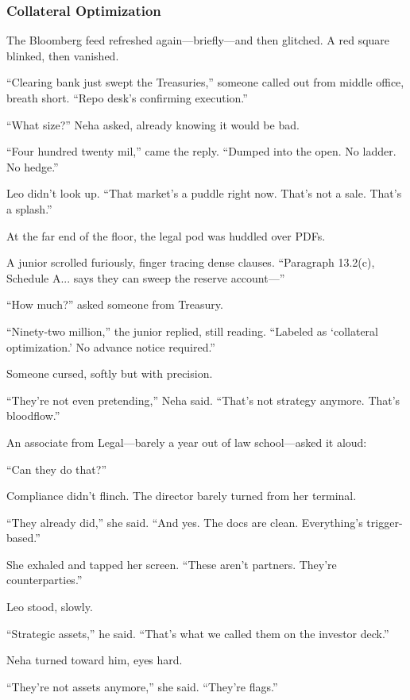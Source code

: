 \medskip

\subsubsection{Collateral Optimization}

The Bloomberg feed refreshed again—briefly—and then glitched.
A red square blinked, then vanished.

“Clearing bank just swept the Treasuries,” someone called out from middle office, breath short. “Repo desk’s confirming execution.”

“What size?” Neha asked, already knowing it would be bad.

“Four hundred twenty mil,” came the reply. “Dumped into the open. No ladder. No hedge.”

Leo didn’t look up. “That market’s a puddle right now. That’s not a sale. That’s a splash.”

At the far end of the floor, the legal pod was huddled over PDFs.

A junior scrolled furiously, finger tracing dense clauses. “Paragraph 13.2(c), Schedule A... says they can sweep the reserve account—”

“How much?” asked someone from Treasury.

“Ninety-two million,” the junior replied, still reading. “Labeled as ‘collateral optimization.’ No advance notice required.”

Someone cursed, softly but with precision.

“They’re not even pretending,” Neha said. “That’s not strategy anymore. That’s bloodflow.”

An associate from Legal—barely a year out of law school—asked it aloud:

“Can they do that?”

Compliance didn’t flinch. The director barely turned from her terminal.

“They already did,” she said. “And yes. The docs are clean. Everything’s trigger-based.”

She exhaled and tapped her screen. “These aren’t partners. They’re counterparties.”

Leo stood, slowly.

“Strategic assets,” he said. “That’s what we called them on the investor deck.”

Neha turned toward him, eyes hard.

“They’re not assets anymore,” she said. “They’re flags.”

